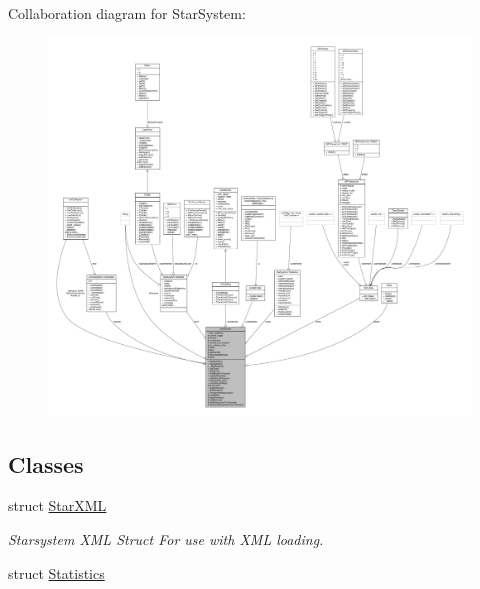 Collaboration diagram for Star\+System\+:
\nopagebreak
\begin{figure}[H]
\begin{center}
\leavevmode
\includegraphics[width=350pt]{db/d44/classStarSystem__coll__graph}
\end{center}
\end{figure}
\subsection*{Classes}
\begin{DoxyCompactItemize}
\item 
struct \hyperlink{structStarSystem_1_1StarXML}{Star\+X\+ML}
\begin{DoxyCompactList}\small\item\em Starsystem X\+ML Struct For use with X\+ML loading. \end{DoxyCompactList}\item 
struct \hyperlink{structStarSystem_1_1Statistics}{Statistics}
\end{DoxyCompactItemize}
